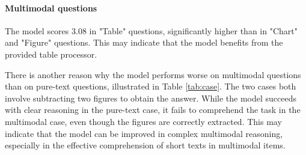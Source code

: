\documentclass{article}
\begin{document}
  \paragraph{Multimodal questions}
  The model scores 3.08 in "Table" questions, significantly higher than in "Chart" and "Figure" questions.
  This may indicate that the model benefits from the provided table processor.

  There is another reason why the model performs worse on multimodal questions than on pure-text questions,
  illustrated in Table \ref{tab:case}.
  The two cases both involve subtracting two figures to obtain the answer.
  While the model succeeds with clear reasoning in the pure-text case, it fails to comprehend the task in the multimodal case, even though the figures are correctly extracted.
  This may indicate that the model can be improved in complex multimodal reasoning,
  especially in the effective comprehension of short texts in multimodal items. 
\end{document}
